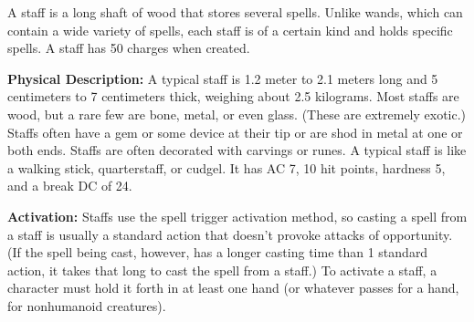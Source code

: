 A staff is a long shaft of wood that stores several spells. Unlike wands, which can contain a wide variety of spells, each staff is of a certain kind and holds specific spells. A staff has 50 charges when created.

\textbf{Physical Description:} A typical staff is 1.2 meter to 2.1 meters long and 5 centimeters to 7 centimeters thick, weighing about 2.5 kilograms. Most staffs are wood, but a rare few are bone, metal, or even glass. (These are extremely exotic.) Staffs often have a gem or some device at their tip or are shod in metal at one or both ends. Staffs are often decorated with carvings or runes. A typical staff is like a walking stick, quarterstaff, or cudgel. It has AC 7, 10 hit points, hardness 5, and a break DC of 24.

\textbf{Activation:} Staffs use the spell trigger activation method, so casting a spell from a staff is usually a standard action that doesn't provoke attacks of opportunity. (If the spell being cast, however, has a longer casting time than 1 standard action, it takes that long to cast the spell from a staff.) To activate a staff, a character must hold it forth in at least one hand (or whatever passes for a hand, for nonhumanoid creatures).


